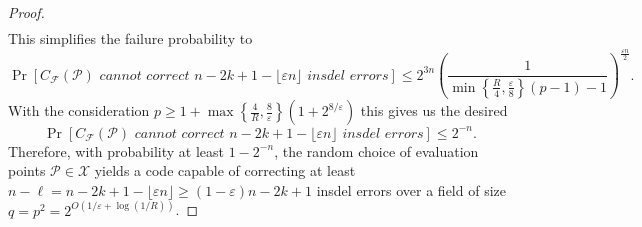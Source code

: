 \documentclass[10pt,a4paper]{amsart}
\begin{document}
\begin{proof}
\begin{align*}
    \end{align*}
    This simplifies the failure probability to 
    $$\Pr[C_{\mathcal{F}}(\mathcal{P}) \textit{ cannot correct $n-2k + 1 - \lfloor \varepsilon n \rfloor$ insdel errors}] \leq 2^{3n}\left(\frac{1}{\min\left\lbrace \frac{R}{4}, \frac{\varepsilon}{8}\right\rbrace(p-1)-1}\right)^{\frac{\varepsilon n}{2}}.$$
    With the consideration $p \geq 1 + \max\left\lbrace \frac{4}{R}, \frac{8}{\varepsilon}\right\rbrace \left(1 +2^{8/\varepsilon}\right)$ this gives us the desired
    $$\Pr[C_{\mathcal{F}}(\mathcal{P}) \textit{ cannot correct $n-2k + 1 - \lfloor \varepsilon n \rfloor$ insdel errors}] \leq 2^{-n}.$$
    Therefore, with probability at least $1-2^{-n}$, the random choice of evaluation points $\mathcal{P} \in \mathcal{X}$ yields a code capable of correcting at least $n-\ell = n-2k+1-\lfloor\varepsilon n\rfloor \geq (1 - \varepsilon)n - 2k + 1$ insdel errors over a field of size $q  = p^2= 2^{O(1/\varepsilon + \log(1/R))}$.
\end{proof}
\end{document}
